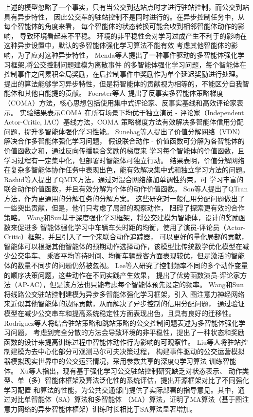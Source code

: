 上述的模型忽略了一个事实，只有当公交到达站点时才进行驻站控制，而公交到站具有异步特性，
因此公交车的驻站控制不是同时进行的。在异步控制任务中，从每个智能体的角度来看，
每个智能体的状态转换可能会收到相邻智能体动作的影响，
导致环境看起来不平稳\cite{laurent2011world}。
环境的非平稳性会对学习过成产生不利于的影响在这种异步设置中，默认的多智能体强化学习算法不能有效
考虑其他智能体的影响，为了应对这种异步特性，
Menda等人\cite{menda2018deep}提出了一种事件驱动的多智能体强化学习框架,将公交控制问题建模为离散事件
的多智能体强化学习问题，每个智能体在控制事件之间累积全局奖励，在后控制事件中奖励作为单个延迟奖励进行处理。
提出的算法能够学习异步特性，但是将智能体的贡献视为相等的，不能区分自我智能体和其他自能提的贡献。
Foerster等人\cite{foerster2018counterfactual}
提出了反事实多智能体策略梯度（COMA）方法，核心思想包括使用集中式评论家、反事实基线和高效评论家表示。
实验结果表示COMA 在所有场景下均优于独立演员 - 评论家（Independent Actor-Critic, IAC）基线方法，COMA 
策略梯度方法有效解决多智能体信用分配问题，提升多智能体强化学习性能。
Sunehag等人\cite{sunehag2017value}提出了价值分解网络（VDN）解决合作多智能体强化学习问题，
假设联合动作 - 价值函数可分解为各智能体的价值函数之和，通过反向传播联合奖励的梯度来
学习每个智能体的价值函数，且学习过程有一定集中化，但部署时智能体可独立行动。
结果表明，价值分解网络在复杂多智能体协作任务中表现出色，能有效解决集中式和独立学习方法的问题。
Rashid等人\cite{rashid2020monotonic}提出了QMIX方法，通过对混合网络施加单调性约束，可
学习丰富的联合动作价值函数，并且有效分解为个体的动作价值函数。
Son等人\cite{son2019qtran}提出了QTran方法，作为更通用的分解任务的分解方案。
这些研究对一般信用分配问题做出了一些突出贡献，但是，他们只考虑了局部的观察动作，
阻碍了探索更有效的合作策略。
Wang和Sun\cite{wang2020dynamic}基于深度强化学习框架，将公交建模为智能体，设计的奖励函数来促进多
智能体强化学习中车辆车头时距的均衡，使用了演员-评论员（Actor-Critic）框架，并且引入了一个来联合动作追踪器，
可以更好的量化局部的贡献，智能体可以根据其他智能体的预期动作选择动作，该模型比传统数学优化模型在减少公交串车、
乘客平均等待时间、均衡车辆载客方面表现较优，但是激活的智能体的数量不同步的问题仍然被忽视。
Lee等人\cite{lee2020reinforcement}研究了控制频率不同的多个动作变量的顺序决策问题，这些动作在不同实践产生效果，
提出了优势函数演员-评论家方法（AP-AC），但是该方法也只能考虑每个智能体预先设定的频率。
Wang和Sun\cite{wang2021reducing}将线路公交驻站控制建模为异步多智能体强化学习框架，引入
图注意力神经网络来近似其他智能体的边际贡献，从而解决了异步控制的信用分配问题，
通过验证模型在减少公交串车和提高系统稳定性方面表现出色，且具有良好的迁移性。
Rodriguez等人\cite{rodriguez2023cooperative}将结合驻站策略和跳站策略的公交控制问题表述为多智能体强化学习问题，
考虑到完全分散的方法会导致环境的非平稳性，提出了一种状态和奖励函数的设计来提高训练过程中智能体动作行为影响的可观察性。
Liu等人\cite{liu2023deep}将驻站控制建模为去中心化部分可观测马尔可夫决策过程，
构建事件驱动的公交运营模拟器模拟现实世界中的公交运营情况，采用参数共享的深度Q学习算法
训练智能体。
Xu等人\cite{xu2025reinforcement}指出，现有基于强化学习公交驻站控制研究缺乏对状态表示、
动作类型、单（多）智能体框架及算法泛化性的系统评估，提出开源框架对比了不同强化学习配置
和算法的性能，为公共交通部门提供了实际部署的指导意见。其中，通过对比单智能体（SA）算法和多智能体
（MA）算法，证明了MA算法（基于图注意力网络的异步智能体框架）训练时长相比于SA算法显著增加。

